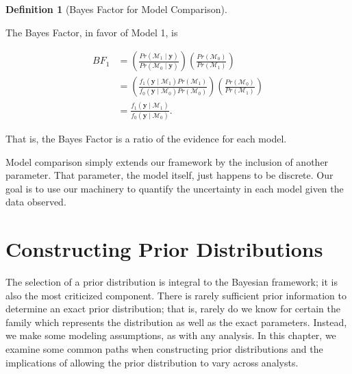 \documentclass[
  letterpaper,
  DIV=11,
  numbers=noendperiod]{scrreprt}
\theoremstyle{definition}
\newtheorem{definition}{Definition}[chapter]
\theoremstyle{plain}
\theoremstyle{definition}
\theoremstyle{remark}
\begin{document}
\begin{definition}[Bayes Factor for Model
Comparison]\protect\hypertarget{def-bayes-factor-models}{}\label{def-bayes-factor-models}

The Bayes Factor, in favor of Model 1, is

\[
\begin{aligned}
  BF_{1} &= \left(\frac{Pr(\mathcal{M}_1 \mid \mathbf{y})}{Pr(\mathcal{M}_0 \mid \mathbf{y})}\right)\left(\frac{Pr(\mathcal{M}_0)}{Pr(\mathcal{M}_1)}\right) \\
    &= \left(\frac{f_1(\mathbf{y} \mid \mathcal{M}_1) Pr(\mathcal{M}_1)}{f_0(\mathbf{y} \mid \mathcal{M}_0) Pr(\mathcal{M}_0)}\right)\left(\frac{Pr(\mathcal{M}_0)}{Pr(\mathcal{M}_1)}\right) \\
    &= \frac{f_1(\mathbf{y} \mid \mathcal{M}_1)}{f_0(\mathbf{y} \mid \mathcal{M}_0)}.
\end{aligned}
\]

That is, the Bayes Factor is a ratio of the evidence for each model.

\end{definition}

Model comparison simply extends our framework by the inclusion of
another parameter. That parameter, the model itself, just happens to be
discrete. Our goal is to use our machinery to quantify the uncertainty
in each model given the data observed.

\hypertarget{sec-constructing-priors}{%
\chapter{Constructing Prior
Distributions}\label{sec-constructing-priors}}

\providecommand{\norm}[1]{\lVert#1\rVert}
\providecommand{\abs}[1]{\lvert#1\rvert}
\providecommand{\iid}{\stackrel{\text{IID}}{\sim}}
\providecommand{\ind}{\stackrel{\text{Ind}}{\sim}}

\providecommand{\bm}[1]{\mathbf{#1}}
\providecommand{\bs}[1]{\boldsymbol{#1}}
\providecommand{\bbeta}{\bs{\beta}}

\providecommand{\Ell}{\mathcal{L}}
\providecommand{\indep}{\perp\negthickspace\negmedspace\perp}

The selection of a prior distribution is integral to the Bayesian
framework; it is also the most criticized component. There is rarely
sufficient prior information to determine an exact prior distribution;
that is, rarely do we know for certain the family which represents the
distribution as well as the exact parameters. Instead, we make some
modeling assumptions, as with any analysis. In this chapter, we examine
some common paths when constructing prior distributions and the
implications of allowing the prior distribution to vary across analysts.
\end{document}
